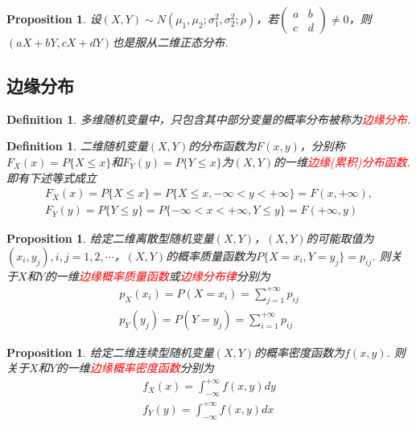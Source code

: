 \documentclass{article}
\newtheorem{proposition}[theorem]{Proposition}
\newtheorem{definition}[theorem]{Definition}
\newcommand{\redt}[1]{\textcolor{red}{#1}}
\begin{document}
\begin{proposition}
\rm 设$(X,Y) \sim N(\mu_1,\mu_2;\sigma_1^2,\sigma_2^2; \rho)$，若$\begin{pmatrix}
a & b \\
c & d
\end{pmatrix} \neq 0$，则$(aX+bY,cX+dY)$也是服从二维正态分布. 
\end{proposition}


\subsection{边缘分布}

\begin{definition}
\rm 多维随机变量中，只包含其中部分变量的概率分布被称为\redt{边缘分布}.
\end{definition}

\begin{definition}
\rm 二维随机变量$(X,Y)$的分布函数为$F(x,y)$，分别称$F_X(x)=P\{X \leq x\}$和$F_Y(y) = P\{Y \leq x\}$为$(X,Y)$的一维\redt{边缘(累积)分布函数}. 即有下述等式成立
$$
\begin{array}{ll}
F_X(x) = P\{X \leq x\} = P\{X \leq x,  -\infty < y < +\infty\} = F(x,+\infty),\\
F_Y(y) = P\{Y \leq y\} = P\{-\infty < x < +\infty, Y \leq y\} = F(+\infty,y)
\end{array}
$$
\end{definition}

\begin{proposition}
\rm 给定二维离散型随机变量$(X,Y)$，$(X,Y)$的可能取值为$(x_i,y_j), i,j =1,2,\cdots$，$(X,Y)$的概率质量函数为$P\{X = x_i,Y = y_j\}=p_{ij}$. 则关于$X$和$Y$的一维\redt{边缘概率质量函数}或\redt{边缘分布律}分别为
$$
\begin{array}{ll}
p_X(x_i) = P(X=x_i) = \sum\limits_{j=1}^{+\infty}p_{ij} \\
p_Y(y_j) = P(Y=y_j) = \sum\limits_{i=1}^{+\infty}p_{ij}  
\end{array}
$$
\end{proposition}

\begin{proposition}
\rm 给定二维连续型随机变量$(X,Y)$的概率密度函数为$f(x,y)$. 则关于$X$和$Y$的一维\redt{边缘概率密度函数}分别为
$$
\begin{array}{ll}
f_X(x) = \int_{-\infty}^{+\infty}f(x,y)dy \\
f_Y(y) = \int_{-\infty}^{+\infty}f(x,y)dx
\end{array}
$$
\end{proposition}
\end{document}
